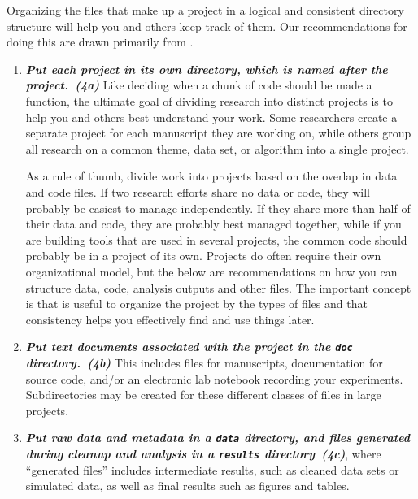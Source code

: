 \documentclass[10pt,letterpaper]{article}
\newcommand{\practice}[2]{\textbf{\emph{{#2}~({#1})}}}
\begin{document}
Organizing the files that make up a project in a logical and
consistent directory structure will help you and others keep track of
them.  Our recommendations for doing this are drawn primarily from
\cite{noble2009,gentzkow2014}.

\begin{enumerate}

\item

  \practice{4a}{Put each project in its own directory, which is named
  after the project.}  Like deciding when a chunk of code should be
  made a function, the ultimate goal of dividing research into
  distinct projects is to help you and others best understand your
  work. Some researchers create a separate project for each manuscript
  they are working on, while others group all research on a common
  theme, data set, or algorithm into a single project.

  As a rule of thumb, divide work into projects based on the overlap
  in data and code files. If two research efforts share no data or
  code, they will probably be easiest to manage independently. If they
  share more than half of their data and code, they are probably best
  managed together, while if you are building tools that are used in
  several projects, the common code should probably be in a project of
  its own. Projects do often require their own organizational model,
  but the below are recommendations on how you can structure data,
  code, analysis outputs and other files. The important concept is
  that is useful to organize the project by the types of files and
  that consistency helps you effectively find and use things later.
  
\item

  \practice{4b}{Put text documents associated with the project in the
  \texttt{doc} directory.} This includes files for manuscripts,
  documentation for source code, and/or an electronic lab notebook
  recording your experiments.  Subdirectories may be created for these
  different classes of files in large projects.

\item

  \practice{4c}{Put raw data and metadata in a \texttt{data}
  directory, and files generated during cleanup and analysis in a
  \texttt{results} directory}, where ``generated files'' includes
  intermediate results, such as cleaned data sets or simulated data,
  as well as final results such as figures and tables.


\end{enumerate}
\end{document}
